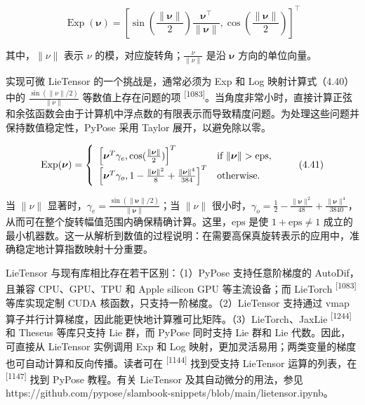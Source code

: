 \begin{equation}
\operatorname{Exp} (\boldsymbol {\nu}) = \left[ \sin \left(\frac {\| \boldsymbol {\nu} \|}{2}\right) \frac {\boldsymbol {\nu} ^ {\top}}{\| \boldsymbol {\nu} \|}, \cos \left(\frac {\| \boldsymbol {\nu} \|}{2}\right) \right] ^ {\top}\tag{4.40}
\end{equation}

其中，$\| \nu \|$ 表示 $\nu$ 的模，对应旋转角；$\frac { \nu } { \left\| \nu \right\| }$ 是沿 $\pmb { \nu }$ 方向的单位向量。

实现可微 LieTensor 的一个挑战是，通常必须为 Exp 和 Log 映射计算式（4.40）中的 $\frac{\sin(\|\nu\|/2)}{\|\nu\|}$ 等数值上存在问题的项 \textsuperscript{[1083]}。当角度非常小时，直接计算正弦和余弦函数会由于计算机中浮点数的有限表示而导致精度问题。为处理这些问题并保持数值稳定性，PyPose 采用 Taylor 展开，以避免除以零。

\begin{equation}
\operatorname{Exp} (\boldsymbol {\nu}) = \left\{ \begin{array}{l l} \left[ \boldsymbol {\nu} ^ {T} \gamma_ {e}, \cos (\frac {\| \boldsymbol {\nu} \|}{2}) \right] ^ {T} & \text {if } \| \boldsymbol{\nu}\| > \mathrm{eps}, \\ \left[ \boldsymbol {\nu} ^ {T} \gamma_ {o}, 1 - \frac {\| \boldsymbol {\nu} \| ^ {2}}{8} + \frac {\| \boldsymbol {\nu} \| ^ {4}}{384} \right] ^ {T} & \text {otherwise.} \end{array} \right.\tag{4.41}
\end{equation}

当 $\| \nu \|$ 显著时，$\gamma_e = \frac{\sin(\|\pmb{\nu}\|/2)}{\|\pmb{\nu}\|}$；当 $\lVert \nu \rVert$ 很小时，$\gamma_o = \frac{1}{2} - \frac{\|\pmb{\nu}\|^2}{48} + \frac{\|\pmb{\nu}\|^4}{3840}$，从而可在整个旋转幅值范围内确保精确计算。这里，$\mathrm{eps}$ 是使 $1 + \mathrm{eps} \neq 1$ 成立的最小机器数。这一从解析到数值的过程说明：在需要高保真旋转表示的应用中，准确稳定地计算指数映射十分重要。

LieTensor 与现有库相比存在若干区别：（1）PyPose 支持任意阶梯度的 AutoDif，且兼容 CPU、GPU、TPU 和 Apple silicon GPU 等主流设备；而 LieTorch \textsuperscript{[1083]} 等库实现定制 CUDA 核函数，只支持一阶梯度。（2）LieTensor 支持通过 vmap 算子并行计算梯度，因此能更快地计算雅可比矩阵。（3）LieTorch、JaxLie \textsuperscript{[1244]} 和 Theseus 等库只支持 Lie 群，而 PyPose 同时支持 Lie 群和 Lie 代数。因此，可直接从 LieTensor 实例调用 Exp 和 Log 映射，更加灵活易用；两类变量的梯度也可自动计算和反向传播。读者可在 \textsuperscript{[1144]} 找到受支持 LieTensor 运算的列表，在 \textsuperscript{[1147]} 找到 PyPose 教程。有关 LieTensor 及其自动微分的用法，参见 https://github.com/pypose/slambook-snippets/blob/main/lietensor.ipynb。

